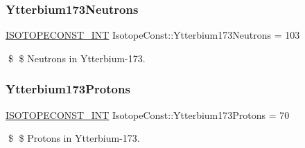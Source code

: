 \subsubsection{\texorpdfstring{Ytterbium173\+Neutrons}{Ytterbium173Neutrons}}
{\footnotesize\ttfamily \mbox{\hyperlink{group___isotope_const-_macros_ga5f18360b3e99483a35c32d789e62621c}{I\+S\+O\+T\+O\+P\+E\+C\+O\+N\+S\+T\+\_\+\+I\+NT}} Isotope\+Const\+::\+Ytterbium173\+Neutrons = 103}

\$ \$ Neutrons in Ytterbium-\/173. \mbox{\label{group___isotope_const-_ytterbium-_yb173_gaae2eb5562cf414109319682e6d9e1f5d}} 
\subsubsection{\texorpdfstring{Ytterbium173\+Protons}{Ytterbium173Protons}}
{\footnotesize\ttfamily \mbox{\hyperlink{group___isotope_const-_macros_ga5f18360b3e99483a35c32d789e62621c}{I\+S\+O\+T\+O\+P\+E\+C\+O\+N\+S\+T\+\_\+\+I\+NT}} Isotope\+Const\+::\+Ytterbium173\+Protons = 70}

\$ \$ Protons in Ytterbium-\/173. 